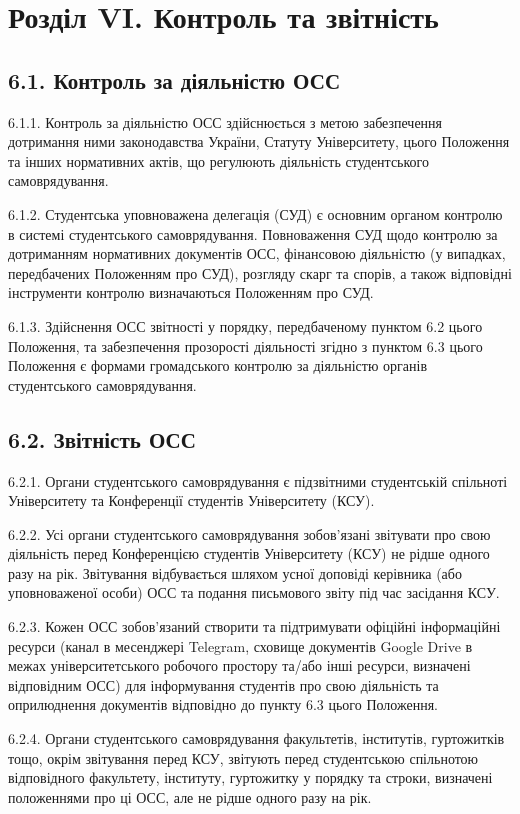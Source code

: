 \section*{Розділ VI. Контроль та звітність}

\subsection*{6.1. Контроль за діяльністю ОСС}
    6.1.1. Контроль за діяльністю ОСС здійснюється з метою забезпечення дотримання ними законодавства України, Статуту Університету, цього Положення та інших нормативних актів, що регулюють діяльність студентського самоврядування.

    6.1.2. Студентська уповноважена делегація (СУД) є основним органом контролю в системі студентського самоврядування. Повноваження СУД щодо контролю за дотриманням нормативних документів ОСС, фінансовою діяльністю (у випадках, передбачених Положенням про СУД), розгляду скарг та спорів, а також відповідні інструменти контролю визначаються Положенням про СУД.

    6.1.3. Здійснення ОСС звітності у порядку, передбаченому пунктом 6.2 цього Положення, та забезпечення прозорості діяльності згідно з пунктом 6.3 цього Положення є формами громадського контролю за діяльністю органів студентського самоврядування.

\subsection*{6.2. Звітність ОСС}
    6.2.1. Органи студентського самоврядування є підзвітними студентській спільноті Університету та Конференції студентів Університету (КСУ).

    6.2.2. Усі органи студентського самоврядування зобов'язані звітувати про свою діяльність перед Конференцією студентів Університету (КСУ) не рідше одного разу на рік. Звітування відбувається шляхом усної доповіді керівника (або уповноваженої особи) ОСС та подання письмового звіту під час засідання КСУ.

    6.2.3. Кожен ОСС зобов'язаний створити та підтримувати офіційні інформаційні ресурси (канал в месенджері Telegram, сховище документів Google Drive в межах університетського робочого простору та/або інші ресурси, визначені відповідним ОСС) для інформування студентів про свою діяльність та оприлюднення документів відповідно до пункту 6.3 цього Положення.

    6.2.4. Органи студентського самоврядування факультетів, інститутів, гуртожитків тощо, окрім звітування перед КСУ, звітують перед студентською спільнотою відповідного факультету, інституту, гуртожитку у порядку та строки, визначені положеннями про ці ОСС, але не рідше одного разу на рік.

